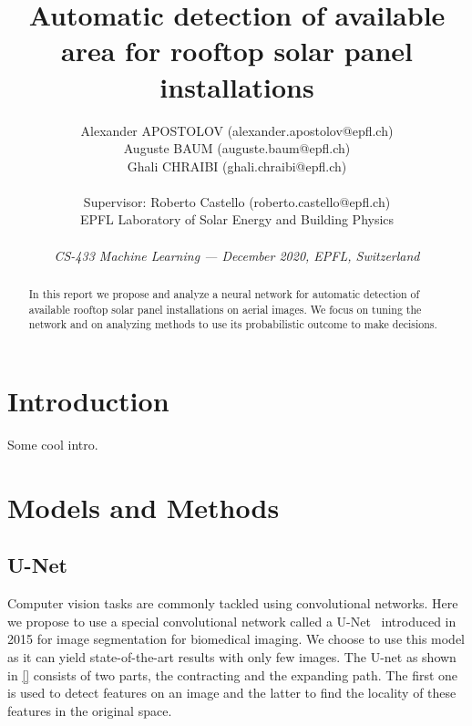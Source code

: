 \documentclass[10pt,conference,compsocconf]{IEEEtran}
\begin{document}
\title{{\LARGE Automatic detection of available area for rooftop solar panel installations}\vspace{-3mm}}    

\author{
  Alexander APOSTOLOV (alexander.apostolov@epfl.ch)\\
  Auguste BAUM (auguste.baum@epfl.ch)\\
  Ghali CHRAIBI (ghali.chraibi@epfl.ch)\\
  \\
  Supervisor: Roberto Castello (roberto.castello@epfl.ch)\\ EPFL Laboratory of Solar Energy and Building Physics\\
  \\
  \textit{CS-433 Machine Learning --- December 2020, EPFL, Switzerland}
}
\maketitle

\begin{abstract}
  In this report we propose and analyze a neural network for automatic detection of available rooftop solar panel installations on aerial images. We focus on tuning the network and on analyzing methods to use its probabilistic outcome to make decisions. 
\end{abstract}

\section{Introduction}
Some cool intro.

\section{Models and Methods}

\subsection{U-Net}
Computer vision tasks are commonly tackled using convolutional networks. 
Here we propose to use a special convolutional network called a U-Net~\cite{ronneberger2015unet} introduced in 2015 for image segmentation for biomedical imaging. We choose to use this model as it can yield state-of-the-art results with only few images. The U-net as shown in \autoref{} consists of two parts, the contracting and the expanding path. The first one is used to detect features on an image and the latter to find the locality of these features in the original space. 
\end{document}
